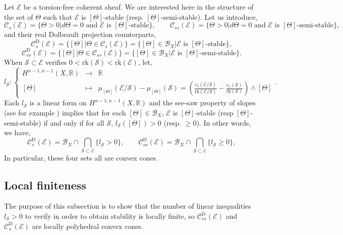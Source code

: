 \documentclass{article}
\theoremstyle{remark}
\theoremstyle{definition}
\newcommand{\R}{\mathbb{R}}
\newcommand{\rk}{\mathrm{rk}}
\newcommand{\E}{\mathcal{E}}
\newcommand{\mC}{\mathcal{C}}
\renewcommand{\geq}{\geqslant}
\newcommand{\fonction}[4]{\left\{ \begin{array}{rcl}
		\displaystyle #1 & \longrightarrow & \displaystyle #2\\
		\displaystyle #3 & \longmapsto & \displaystyle #4
	\end{array} \right.}
\begin{document}
Let $\E$ be a torsion-free coherent sheaf. We are interested here in the structure of the set of $\Theta$ such that $\E$ is $[\Theta]$-stable (resp. $[\Theta]$-semi-stable). Let us introduce,
$$
\mC_s(\E) = \{\Theta > 0|d\Theta = 0 \textrm{ and $\E$ is $[\Theta]$-stable}\}, \qquad \mC_{ss}(\E) = \{\Theta > 0|d\Theta = 0 \textrm{ and $\E$ is $[\Theta]$-semi-stable}\},
$$
and their real Dolbeault projection counterparts,
$$
\mC_s^{\mathrm{D}}(\E) = \{[\Theta]|\Theta \in \mC_s(\E)\} = \{[\Theta] \in \mathcal{B}_X|\E \textrm{ is $[\Theta]$-stable}\},
$$
$$
\mC_{ss}^{\mathrm{D}}(\E) = \{[\Theta]|\Theta \in \mC_{ss}(\E)\} = \{[\Theta] \in \mathcal{B}_X|\E \textrm{ is $[\Theta]$-semi-stable}\}.
$$
When $\mathcal{S} \subset \E$ verifies $0 < \rk(\mathcal{S}) < \rk(\E)$, let,
$$
l_{\mathcal{S}} : \fonction{H^{n - 1,n - 1}(X,\R)}{\R}{[\Theta]}{\mu_{[\Theta]}(\E/\mathcal{S}) - \mu_{[\Theta]}(\mathcal{S}) = \left(\frac{c_1(\E/\mathcal{S})}{\rk(\E/\mathcal{S})} - \frac{c_1(\mathcal{S})}{\rk(\mathcal{S})}\right) \wedge [\Theta]}.
$$
Each $l_{\mathcal{S}}$ is a linear form on $H^{n - 1,n - 1}(X,\R)$ and the see-saw property of slopes (see for example \cite[Proposition 5.7.4]{Kobayashi}) implies that for each $[\Theta] \in \mathcal{B}_X$, $\E$ is $[\Theta]$-stable (resp $[\Theta]$-semi-stable) if and only if for all $\mathcal{S}$, $l_{\mathcal{S}}([\Theta]) > 0$ (resp. $\geq 0$). In other words, we have,
$$
\mC_s^{\mathrm{D}}(\E) = \mathcal{B}_X \cap \bigcap_{\mathcal{S} \subset \E}\{l_{\mathcal{S}} > 0\}, \qquad \mC_{ss}^{\mathrm{D}}(\E) = \mathcal{B}_X \cap \bigcap_{\mathcal{S} \subset \E}\{l_{\mathcal{S}} \geq 0\},
$$
In particular, these four sets all are convex cones.

\subsection{Local finiteness}

The purpose of this subsection is to show that the number of linear inequalities $l_{\mathcal{S}} > 0$ to verify in order to obtain stability is locally finite, so $\mC_{ss}^{\mathrm{D}}(\E)$ and $\mC_s^{\mathrm{D}}(\E)$ are locally polyhedral convex cones.
\end{document}
